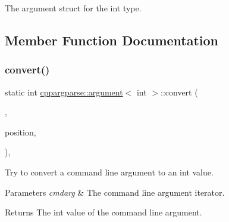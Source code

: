The argument struct for the int type. 

\subsection{Member Function Documentation}
\mbox{\label{structcppargparse_1_1argument_3_01int_01_4_a8c3b45ea01897660bf5d1e5f7c9d7c41}} 
\subsubsection{\texorpdfstring{convert()}{convert()}}
{\footnotesize\ttfamily static int \hyperlink{structcppargparse_1_1argument}{cppargparse\+::argument}$<$ int $>$\+::convert (\begin{DoxyParamCaption}\item[{const types\+::\+Command\+Line\+\_\+t \&}]{,  }\item[{const types\+::\+Command\+Line\+Position\+\_\+t \&}]{position,  }\item[{const types\+::\+Command\+Line\+Arguments\+\_\+t \&}]{ }\end{DoxyParamCaption})\hspace{0.3cm}{\ttfamily [inline]}, {\ttfamily [static]}}



Try to convert a command line argument to an int value. 


\begin{DoxyParams}{Parameters}
{\em cmdarg} & The command line argument iterator.\\
\hline
\end{DoxyParams}
\begin{DoxyReturn}{Returns}
The int value of the command line argument. 
\end{DoxyReturn}
\mbox{\label{structcppargparse_1_1argument_3_01int_01_4_af6a2f748b086ad7122f7bb6affbe354e}} 
